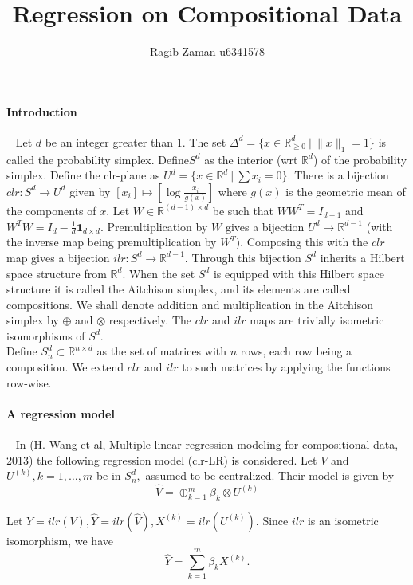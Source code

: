 \documentclass[a4paper,12pt]{article}
\title{Regression on Compositional Data}
\author{Ragib Zaman u6341578}
\begin{document}
\maketitle

\paragraph{Introduction }
\
\newline
Let $d$ be an integer greater than $1.$ The set $\Delta^d = \{ x \in \mathbb{R}^d_{\geq 0} \ | \ \| x \|_1 = 1 \}$ is called the probability simplex. Define$S^d$
as the interior (wrt $\mathbb{R}^d$) of the probability simplex. Define the clr-plane as $U^d = \{ x \in \mathbb{R}^d \ | \ \sum x_i = 0\}.$ There is a bijection $clr : S^d \to U^d$ given by $[x_i] \mapsto [\log \frac{x_i}{g(x)}]$
where $g(x)$ is the geometric mean of the components of $x.$ Let $W\in \mathbb{R}^{(d-1)\times d}$ be such that $WW^T= I_{d-1}$ and $W^TW = I_d - \frac{1}{d} \mathbf{1}_{d\times d}.$ Premultiplication by $W$ gives a bijection $U^d \to \mathbb{R}^{d-1}$ (with the inverse map being premultiplication by $W^T$). Composing this with the $clr$ map gives a bijection $ilr: S^d \to \mathbb{R}^{d-1}.$ Through this bijection $S^d$ inherits a Hilbert space structure from $\mathbb{R}^d.$ When the set $S^d$ is equipped with this Hilbert space structure it is called the Aitchison simplex, and its elements are called compositions. We shall denote addition and multiplication in the Aitchison simplex by $\oplus$ and $\otimes$ respectively. The $clr$ and $ilr$ maps are trivially isometric isomorphisms of $S^d.$ 
\\
Define $S^d_n \subset \mathbb{R}^{n \times d}$ as the set of matrices with $n$ rows, each row being a composition. We extend $clr$ and $ilr$ to such matrices by applying the functions row-wise. 

\paragraph{A regression model}
\
\newline
In (H. Wang et al, Multiple linear regression modeling for compositional data, 2013) the following regression model (clr-LR) is considered. Let $V$ and $U^{(k)}, k=1,\ldots, m$ be in $S^d_n,$ assumed to be centralized. Their model is given by $$ \hat{V} = \oplus_{k=1}^m \beta_k \otimes U^{(k)} $$

Let $Y = ilr(V), \hat{Y} = ilr(\hat{V}), X^{(k)} = ilr( U^{(k)} ).$  Since $ilr$ is an isometric isomorphism, we have $$ \hat{Y} = \sum_{k=1}^m \beta_k X^{(k)}.$$
\end{document}
